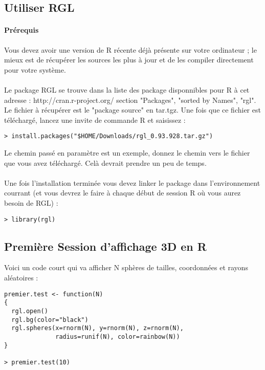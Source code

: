                                       
\subsection{Utiliser RGL}

\paragraph{Prérequis} Vous devez avoir une version de R récente déjà présente sur votre ordinateur ; le mieux est de récupérer les sources les plus à jour et de les compiler directement pour votre système. 
\\ \\
Le package RGL se trouve dans la liste des package disponnibles pour R à cet adresse : http://cran.r-project.org/ section "Packages", "sorted by Names", "rgl". Le fichier à récupérer est le "package source" en tar.tgz. Une fois que ce fichier est téléchargé, lancez une invite de commande R et saisissez : 

\begin{lstlisting}
> install.packages("$HOME/Downloads/rgl_0.93.928.tar.gz")
\end{lstlisting}

Le chemin passé en paramètre est un exemple, donnez le chemin vers le fichier que vous avez téléchargé. Celà devrait prendre un peu de temps. \\ \\
Une fois l'installation terminée vous devez linker le package dans l'environnement courrant (et vous devrez le faire à chaque début de session R où vous aurez besoin de RGL) : 

\begin{lstlisting}
> library(rgl)
\end{lstlisting}
\newpage
\subsection{Première Session d'affichage 3D en R}

Voici un code court qui va afficher N sphères de tailles, coordonnées et rayons aléatoires : 

\begin{lstlisting}
premier.test <- function(N)
{
  rgl.open()
  rgl.bg(color="black")
  rgl.spheres(x=rnorm(N), y=rnorm(N), z=rnorm(N), 
              radius=runif(N), color=rainbow(N))
}

> premier.test(10)
\end{lstlisting}

